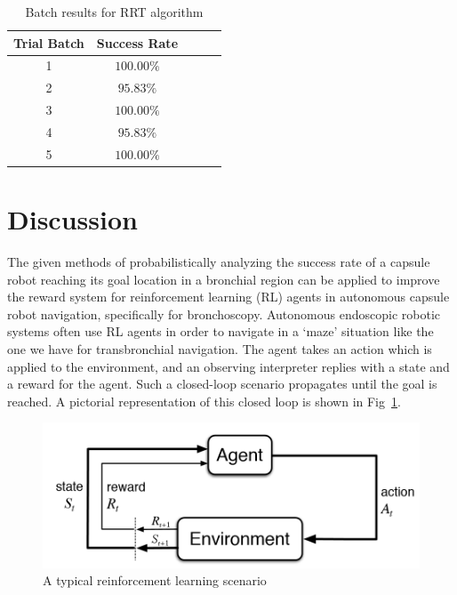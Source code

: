 \documentclass[conference]{IEEEtran}
\begin{document}
\begin{table}[h!]
    \begin{center}
        \begin{tabular}{||c|c|c|c|c||}
        \hline
        Trial Batch & Success Rate \\
        \hline\hline
        1 & $100.00\%$ \\
        2 & $95.83\%$  \\
        3 & $100.00\%$ \\
        4 & $95.83\%$ \\
        5 & $100.00\%$ \\
        \hline
        \end{tabular}
    \end{center}
    \caption{Batch results for RRT algorithm}
    \label{rrt-batch-table}
\end{table}



\section{Discussion}
The given methods of probabilistically analyzing the success rate of a capsule robot reaching
its goal location in a bronchial region can be applied to improve the reward system for 
reinforcement learning (RL) agents in autonomous capsule robot navigation, specifically for
bronchoscopy. Autonomous endoscopic robotic systems
often use RL agents\cite{Turan2019} in order to navigate in a `maze' situation like the one we have
for transbronchial navigation. The agent takes an action which is applied to the environment,
and an observing interpreter replies with a state and a reward for the agent. Such a closed-loop scenario 
propagates until the goal is reached. A pictorial representation of this closed loop is shown
in Fig~\ref{rl-loop-fig}.

\begin{figure}[h]
    \centering
    \includegraphics[scale=0.23]{rl-loop.png}
    \caption{A typical reinforcement learning scenario}
    \label{rl-loop-fig}
\end{figure}
\end{document}

